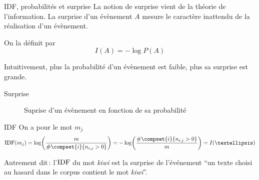 \documentclass[../allslides.tex]{subfiles}
\begin{document}

\begin{frame}{IDF, probabilités et surprise}
	La notion de \alert{surprise} vient de la théorie de l'information. La surprise d'un évènement \(A\) mesure le caractère inattendu de la réalisation d'un évènement.

	On la définit par
	\begin{equation}
		I(A) = -\log P(A)
	\end{equation}

	Intuitivement, plus la probabilité d'un évènement est faible, plus sa surprise est grande.
\end{frame}

\begin{frame}{Surprise}
	\begin{figure}
		\tikzset{external/export=true}
		\caption{Suprise d'un évènement en fonction de sa probabilité}
	\end{figure}
\end{frame}

\begin{frame}{IDF}
	On a pour le mot \(m_j\)
	\begin{equation}
		\IDF(m_j) = \log\mleft(\frac{m}{\#\compset{i}{n_{i,j}>0}}\mright) = -\log\mleft(\frac{\#\compset{i}{n_{i,j}>0}}{m}\mright) = I(…)
	\end{equation}

	Autrement dit : l'\(\operatorname{IDF}\) du mot \emph{kiwi} est la surprise de l'événement \enquote{un texte choisi au hasard dans le corpus contient le mot \emph{kiwi}}.
\end{frame}


\end{document}
